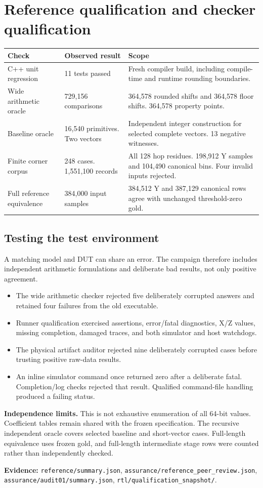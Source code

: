 \documentclass[11pt,letterpaper]{article}
\newcommand{\page}[1]{\clearpage\section{#1}}
\newcommand{\evidence}[1]{\par{\footnotesize\raggedright\sloppy\color{muted}\textbf{Evidence:} #1\par}}
\newcommand{\epath}[1]{\nolinkurl{#1}}
\newcommand{\callout}[2]{\par\medskip\noindent\textbf{#1.} #2\par\smallskip}
\begin{document}
\page{Reference qualification and checker qualification}
\par\noindent\begin{minipage}{\linewidth}
\noindent\begin{tabularx}{\linewidth}{P{1.6in}P{1.55in}L}
\toprule
\textbf{Check} & \textbf{Observed result} & \textbf{Scope}\\
\midrule
C++ unit regression & 11 tests passed & Fresh compiler build, including compile-time and runtime rounding boundaries.\\
Wide arithmetic oracle & 729,156 comparisons & 364,578 rounded shifts and 364,578 floor shifts. 364,578 property points.\\
Baseline oracle & 16,540 primitives. Two vectors & Independent integer construction for selected complete vectors. 13 negative witnesses.\\
Finite corner corpus & 248 cases. 1,551,100 records & All 128 hop residues. 198,912 Y samples and 104,490 canonical bins. Four invalid inputs rejected.\\
Full reference equivalence & 384,000 input samples & 384,512 Y and 387,129 canonical rows agree with unchanged threshold-zero gold.\\
\bottomrule
\end{tabularx}\par\end{minipage}\par
\subsection{Testing the test environment}
A matching model and DUT can share an error. The campaign therefore includes independent arithmetic formulations and deliberate bad results, not only positive agreement.
\begin{itemize}
\item The wide arithmetic checker rejected five deliberately corrupted answers and retained four failures from the old executable.
\item Runner qualification exercised assertions, error/fatal diagnostics, X/Z values, missing completion, damaged traces, and both simulator and host watchdogs.
\item The physical artifact auditor rejected nine deliberately corrupted cases before trusting positive raw-data results.
\item An inline simulator command once returned zero after a deliberate fatal. Completion/log checks rejected that result. Qualified command-file handling produced a failing status.
\end{itemize}
\callout{Independence limits}{This is not exhaustive enumeration of all 64-bit values. Coefficient tables remain shared with the frozen specification. The recursive independent oracle covers selected baseline and short-vector cases. Full-length equivalence uses frozen gold, and full-length intermediate stage rows were counted rather than independently checked.}
\evidence{\epath{reference/summary.json}, \epath{assurance/reference_peer_review.json}, \epath{assurance/audit01/summary.json}, \epath{rtl/qualification_snapshot/}.}
\end{document}

